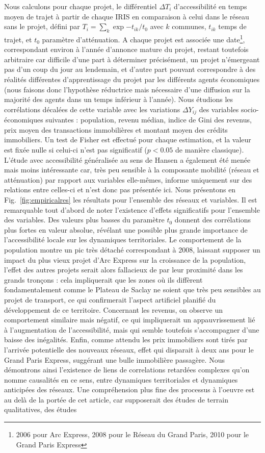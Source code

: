 \documentclass[french]{./sageo}
\begin{document}
Nous calculons pour chaque projet, le différentiel $\Delta T_i$ d'accessibilité en temps moyen de trajet à partir de chaque IRIS en comparaison à celui dans le réseau sans le projet, défini par $T_i = \sum_k \exp{-t_{ik}/t_0}$ avec $k$ communes, $t_{ik}$ temps de trajet, et $t_0$ paramètre d'atténuation. A chaque projet est associée une date\footnote{2006 pour Arc Express, 2008 pour le Réseau du Grand Paris, 2010 pour le Grand Paris Express}, correspondant environ à l'année d'annonce mature du projet, restant toutefois arbitraire car difficile d'une part à déterminer précisément, un projet n'émergeant pas d'un coup du jour au lendemain, et d'autre part pouvant correspondre à des réalités différentes d'apprentissage du projet par les différents agents économiques (nous faisons donc l'hypothèse réductrice mais nécessaire d'une diffusion sur la majorité des agents dans un temps inférieur à l'année). Nous étudions les corrélations décalées de cette variable avec les variations $\Delta Y_{ij}$ des variables socio-économiques suivantes : population, revenu médian, indice de Gini des revenus, prix moyen des transactions immobilières et montant moyen des crédits immobiliers. Un test de Fisher est effectué pour chaque estimation, et la valeur est fixée nulle si celui-ci n'est pas significatif ($p<0.05$ de manière classique). L'étude avec accessibilité généralisée au sens de Hansen a également été menée mais moins intéressante car, très peu sensible à la composante mobilité (réseau et atténuation) par rapport aux variables elle-mêmes, informe uniquement sur des relations entre celles-ci et n'est donc pas présentée ici. Nous présentons en Fig.~\ref{fig:empiricalres} les résultats pour l'ensemble des réseaux et variables. Il est remarquable tout d'abord de noter l'existence d'effets significatifs pour l'ensemble des variables. Des valeurs plus basses du paramètre $t_0$ donnent des corrélations plus fortes en valeur absolue, révélant une possible plus grande importance de l'accessibilité locale sur les dynamiques territoriales. Le comportement de la population montre un pic très détaché correspondant à 2008, laissant supposer un impact du plus vieux projet d'Arc Express sur la croissance de la population, l'effet des autres projets serait alors fallacieux de par leur proximité dans les grands tronçons : cela impliquerait que les zones où ils diffèrent fondamentalement comme le Plateau de Saclay ne soient que très peu sensibles au projet de transport, ce qui confirmerait l'aspect artificiel planifié du développement de ce territoire. Concernant les revenus, on observe un comportement similaire mais négatif, ce qui impliquerait un appauvrissement lié à l'augmentation de l'accessibilité, mais qui semble toutefois s'accompagner d'une baisse des inégalités. Enfin, comme attendu les prix immobiliers sont tirés par l'arrivée potentielle des nouveaux réseaux, effet qui disparait à deux ans pour le Grand Paris Express, suggérant une bulle immobilière passagère. Nous démontrons ainsi l'existence de liens de correlations retardées complexes qu'on nomme causalités en ce sens, entre dynamiques territoriales et dynamiques anticipées des réseaux. Une compréhension plus fine des processus à l'oeuvre est au delà de la portée de cet article, car supposerait des études de terrain qualitatives, des études 
\end{document}
